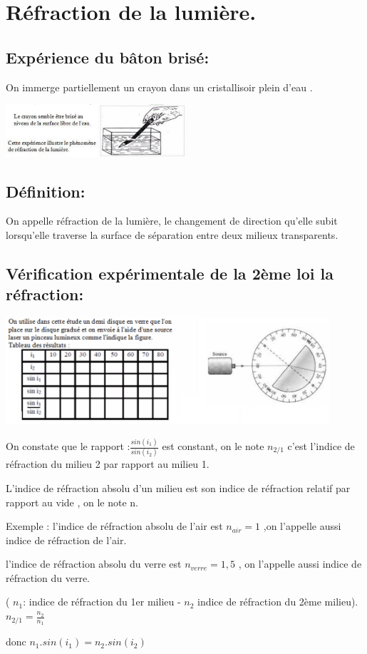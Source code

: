 \documentclass[12pt]{article}
\begin{document}
  \section{Réfraction de la lumière.}
\subsection{Expérience du bâton brisé: }
On immerge partiellement un crayon dans un cristallisoir plein d'eau .
  \begin{center}
    \includegraphics[width=0.5\textwidth]{./img/Optique_03.png}
\end{center}
\subsection{Définition: }
\begin{tcolorbox}
  On appelle réfraction de la lumière, le changement de direction qu'elle subit lorsqu'elle traverse la surface de séparation entre deux milieux transparents.
\end{tcolorbox}
\subsection{Vérification expérimentale de la 2ème loi la réfraction:}
  \begin{center}
    \includegraphics[width=0.9\textwidth]{./img/Optique_04.png}
\end{center}

On constate que le rapport :$\frac{sin(i_1)}{sin(i_2)}$
est constant, on le note $n_{2/1}$ c'est l'indice de réfraction du milieu 2 par rapport au milieu 1.

L'indice de réfraction absolu d'un milieu est son indice de réfraction relatif par rapport au vide , on le note n.

Exemple : l'indice de réfraction absolu de l'air est $n_{air}=1$ ,on l'appelle aussi indice de réfraction de l'air.

l'indice de réfraction absolu du verre est $n_{verre}=1,5$ , on l'appelle aussi indice de réfraction du verre.


( $n_1$: indice de réfraction du 1er milieu -  $n_2$ indice de réfraction du 2ème milieu). $n_{2/1} = \frac{n_2}{n_1}$

donc $n_1.sin(i_1) = n_2.sin(i_2)$
\end{document}
